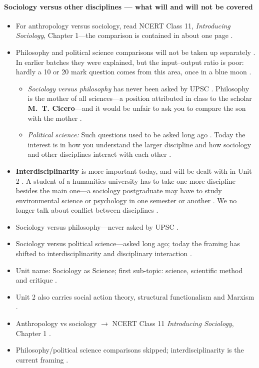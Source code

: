 \paragraph{Sociology versus other disciplines --- what will and will not be covered}
\begin{itemize}
    \item For anthropology versus sociology, read NCERT Class 11, \textit{Introducing Sociology}, Chapter 1---the comparison is contained in about one page .
    \item Philosophy and political science comparisons will not be taken up separately . In earlier batches they were explained, but the input--output ratio is poor: hardly a 10 or 20 mark question comes from this area, once in a blue moon .
    \begin{itemize}
        \item \textit{Sociology versus philosophy} has never been asked by UPSC . Philosophy is the mother of all sciences---a position attributed in class to the scholar \textbf{M.~T. Cicero}---and it would be unfair to ask you to compare the son with the mother .
        \item \textit{Political science:} Such questions used to be asked long ago . Today the interest is in how you understand the larger discipline and how sociology and other disciplines interact with each other .
    \end{itemize}
    \item \textbf{Interdisciplinarity} is more important today, and will be dealt with in Unit 2 . A student of a humanities university has to take one more discipline besides the main one---a sociology postgraduate may have to study environmental science or psychology in one semester or another . We no longer talk about conflict between disciplines .
\end{itemize}

\begin{PYQLink}
\begin{itemize}
    \item Sociology versus philosophy---never asked by UPSC .
    \item Sociology versus political science---asked long ago; today the framing has shifted to interdisciplinarity and disciplinary interaction .
\end{itemize}
\end{PYQLink}

\begin{QuickRevision}
\begin{itemize}
    \item Unit name: Sociology as Science; first sub-topic: science, scientific method and critique .
    \item Unit 2 also carries social action theory, structural functionalism and Marxism .
    \item Anthropology vs sociology $\rightarrow$ NCERT Class 11 \textit{Introducing Sociology}, Chapter 1 .
    \item Philosophy/political science comparisons skipped; interdisciplinarity is the current framing .
\end{itemize}
\end{QuickRevision}

